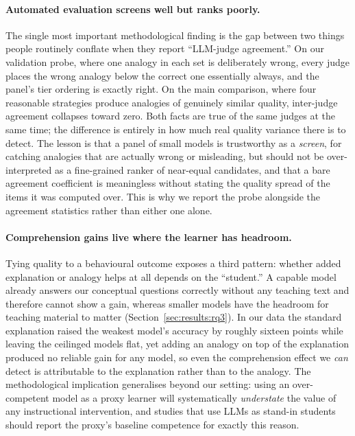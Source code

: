 \documentclass[11pt]{article}
\begin{document}
\paragraph{Automated evaluation screens well but ranks poorly.}
The single most important methodological finding is the gap between two things people
routinely conflate when they report ``LLM-judge agreement.'' On our validation probe,
where one analogy in each set is deliberately wrong, every judge places the wrong analogy
below the correct one essentially always, and the panel's tier ordering is exactly right.
On the main comparison, where four reasonable strategies produce analogies of genuinely
similar quality, inter-judge agreement collapses toward zero. Both facts are true of the
same judges at the same time; the difference is entirely in how much real quality variance
there is to detect. The lesson is that a panel of small models is trustworthy as a
\emph{screen}, for catching analogies that are actually wrong or misleading, but should
not be over-interpreted as a fine-grained ranker of near-equal candidates, and that a bare
agreement coefficient is meaningless without stating the quality spread of the items it was
computed over. This is why we report the probe alongside the agreement statistics rather
than either one alone.

\paragraph{Comprehension gains live where the learner has headroom.}
Tying quality to a behavioural outcome exposes a third pattern: whether added explanation
or analogy helps at all depends on the ``student.'' A capable model already answers our
conceptual questions correctly without any teaching text and therefore cannot show a gain,
whereas smaller models have the headroom for teaching material to matter
(Section~\ref{sec:results:rq3}). In our data the standard explanation raised the weakest
model's accuracy by roughly sixteen points while leaving the ceilinged models flat, yet adding
an analogy on top of the explanation produced no reliable gain for any model, so even the
comprehension effect we \emph{can} detect is attributable to the explanation rather than to
the analogy. The methodological implication generalises beyond our setting: using
an over-competent model as a proxy learner will systematically \emph{understate} the value
of any instructional intervention, and studies that use LLMs as stand-in students should
report the proxy's baseline competence for exactly this reason.
\end{document}
